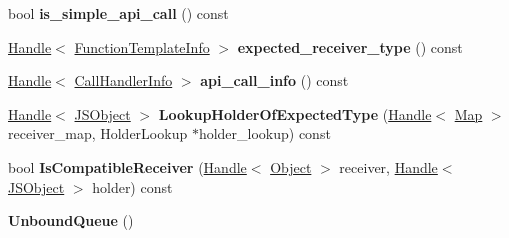 \begin{DoxyCompactItemize}
\item 
\hypertarget{classv8_1_1internal_1_1_b_a_s_e___e_m_b_e_d_d_e_d_a96012bd51cb5d3c44e4e91ed927d1d52}{}bool {\bfseries is\+\_\+simple\+\_\+api\+\_\+call} () const \label{classv8_1_1internal_1_1_b_a_s_e___e_m_b_e_d_d_e_d_a96012bd51cb5d3c44e4e91ed927d1d52}

\item 
\hypertarget{classv8_1_1internal_1_1_b_a_s_e___e_m_b_e_d_d_e_d_a6fe8e647893d089e6a357b21e5086095}{}\hyperlink{classv8_1_1internal_1_1_handle}{Handle}$<$ \hyperlink{classv8_1_1internal_1_1_function_template_info}{Function\+Template\+Info} $>$ {\bfseries expected\+\_\+receiver\+\_\+type} () const \label{classv8_1_1internal_1_1_b_a_s_e___e_m_b_e_d_d_e_d_a6fe8e647893d089e6a357b21e5086095}

\item 
\hypertarget{classv8_1_1internal_1_1_b_a_s_e___e_m_b_e_d_d_e_d_acc855c7de2606e20a8813605114d4fe5}{}\hyperlink{classv8_1_1internal_1_1_handle}{Handle}$<$ \hyperlink{classv8_1_1internal_1_1_call_handler_info}{Call\+Handler\+Info} $>$ {\bfseries api\+\_\+call\+\_\+info} () const \label{classv8_1_1internal_1_1_b_a_s_e___e_m_b_e_d_d_e_d_acc855c7de2606e20a8813605114d4fe5}

\item 
\hypertarget{classv8_1_1internal_1_1_b_a_s_e___e_m_b_e_d_d_e_d_af74f0d8ea742757c554a08e8287a0415}{}\hyperlink{classv8_1_1internal_1_1_handle}{Handle}$<$ \hyperlink{classv8_1_1internal_1_1_j_s_object}{J\+S\+Object} $>$ {\bfseries Lookup\+Holder\+Of\+Expected\+Type} (\hyperlink{classv8_1_1internal_1_1_handle}{Handle}$<$ \hyperlink{classv8_1_1internal_1_1_map}{Map} $>$ receiver\+\_\+map, Holder\+Lookup $\ast$holder\+\_\+lookup) const \label{classv8_1_1internal_1_1_b_a_s_e___e_m_b_e_d_d_e_d_af74f0d8ea742757c554a08e8287a0415}

\item 
\hypertarget{classv8_1_1internal_1_1_b_a_s_e___e_m_b_e_d_d_e_d_a0de7995c16405f518cd21104e6bd5108}{}bool {\bfseries Is\+Compatible\+Receiver} (\hyperlink{classv8_1_1internal_1_1_handle}{Handle}$<$ \hyperlink{classv8_1_1internal_1_1_object}{Object} $>$ receiver, \hyperlink{classv8_1_1internal_1_1_handle}{Handle}$<$ \hyperlink{classv8_1_1internal_1_1_j_s_object}{J\+S\+Object} $>$ holder) const \label{classv8_1_1internal_1_1_b_a_s_e___e_m_b_e_d_d_e_d_a0de7995c16405f518cd21104e6bd5108}

\item 
\hypertarget{classv8_1_1internal_1_1_b_a_s_e___e_m_b_e_d_d_e_d_a7d3dd2afac2f9078f337b1a6611570af}{}{\bfseries Unbound\+Queue} ()\label{classv8_1_1internal_1_1_b_a_s_e___e_m_b_e_d_d_e_d_a7d3dd2afac2f9078f337b1a6611570af}


\end{DoxyCompactItemize}
